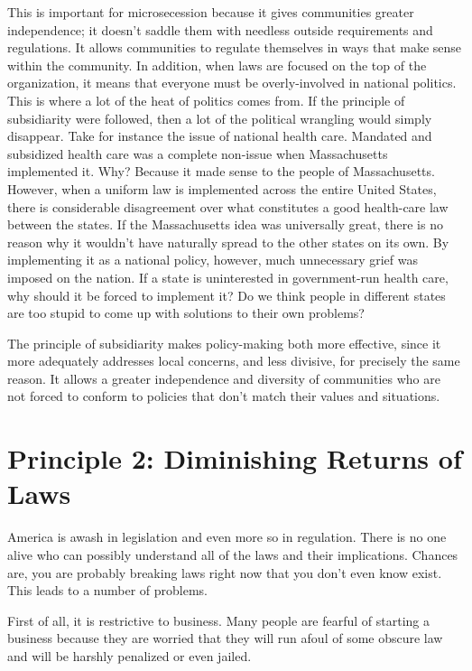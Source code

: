 This is important for microsecession because it gives communities
greater independence; it doesn't saddle them with
needless outside requirements and regulations. It allows communities to
regulate themselves in ways that make sense within the community. In
addition, when laws are focused on the top of the organization, it
means that everyone must be overly-involved in national politics. This
is where a lot of the heat of politics comes from. If the principle of
subsidiarity were followed, then a lot of the political wrangling would
simply disappear. Take for instance the issue of national health care.
Mandated and subsidized health care was a complete non-issue when
Massachusetts implemented it. Why? Because it made sense to the people
of Massachusetts. However, when a uniform law is implemented across the
entire United States, there is considerable disagreement over what
constitutes a good health-care law between the states. If the
Massachusetts idea was universally great, there is no reason why it
wouldn't have naturally spread to the other states on its own.
By implementing it as a national policy, however, much unnecessary
grief was imposed on the nation. If a state is uninterested in
government-run health care, why should it be forced to implement it?  Do
we think people in different states are too stupid to come up with
solutions to their own problems?

The principle of subsidiarity makes policy-making both more effective,
since it more adequately addresses local concerns, and less divisive,
for precisely the same reason. It allows a greater independence and
diversity of communities who are not forced to conform to policies that
don't match their values and situations.

\section{Principle 2: Diminishing Returns of Laws}

America is awash in legislation and even more so in regulation. There is
no one alive who can possibly understand all of the laws and their
implications. Chances are, you are probably breaking laws right now
that you don't even know exist. This leads to a number
of problems. 

First of all, it is restrictive to business. Many people are fearful of
starting a business because they are worried that they will run afoul
of some obscure law and will be harshly penalized or even jailed. 


